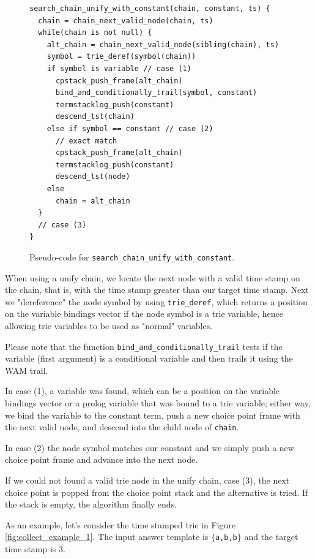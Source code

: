 \begin{figure}[H]
\begin{Verbatim}[fontsize=\small]
search_chain_unify_with_constant(chain, constant, ts) {
  chain = chain_next_valid_node(chain, ts)
  while(chain is not null) {
    alt_chain = chain_next_valid_node(sibling(chain), ts)
    symbol = trie_deref(symbol(chain))
    if symbol is variable // case (1)
      cpstack_push_frame(alt_chain)
      bind_and_conditionally_trail(symbol, constant)
      termstacklog_push(constant)
      descend_tst(chain)
    else if symbol == constant // case (2)
      // exact match
      cpstack_push_frame(alt_chain)
      termstacklog_push(constant)
      descend_tst(node)
    else
      chain = alt_chain
  }
  // case (3)
}
\end{Verbatim}
\caption{Pseudo-code for \texttt{search\_chain\_unify\_with\_constant}.}
\label{fig:search_chain_unify_with_constant}
\end{figure}

When using a unify chain, we locate the next node with a valid time stamp on the chain, that is, with the time stamp greater than our target time stamp. Next we "dereference" the node symbol by using
\texttt{trie\_deref}, which returns a position on the variable bindings vector if the node symbol is a trie variable, hence allowing trie variables to be used as "normal" variables.

Please note that the function \texttt{bind\_and\_conditionally\_trail} tests if the variable (first argument) is a conditional variable and then trails it using the WAM trail.

In case (1), a variable was found, which can be a position on the variable bindings vector or a prolog variable that was bound to a trie variable; either way, we bind the variable to the constant term, push a new choice point frame with the next valid node, and descend into the child node of \texttt{chain}.

In case (2) the node symbol matches our constant and we simply push a new choice point frame and advance into the next node.

If we could not found a valid trie node in the unify chain, case (3), the next choice point is popped from the choice point stack and the alternative is tried. If the stack is empty, the algorithm finally ends.

As an example, let's consider the time stamped trie in Figure \ref{fig:collect_example_1}. The input answer template is $\{$\texttt{a,b,b}$\}$ and the target time stamp is 3.

